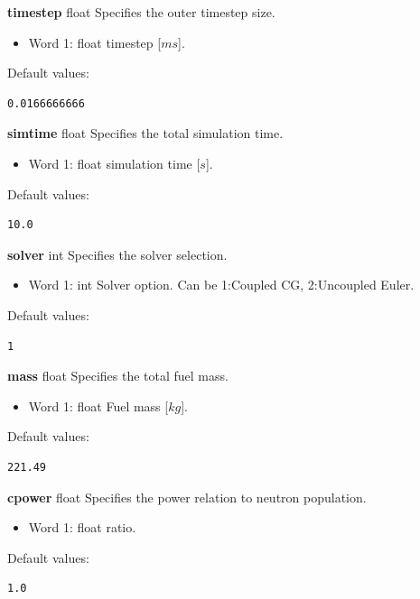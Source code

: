 \documentclass[11pt,letterpaper,titlepage]{article}
\begin{document}
\noindent
\textbf{timestep} {\color{blue} float} \newline
Specifies the outer timestep size.
\begin{itemize}
	\item Word 1: {\color{blue} float} timestep [$ms$].
\end{itemize}
Default values:
\begin{verbatim}
0.0166666666
\end{verbatim}
\vspace {0.5 cm}

\noindent
\textbf{simtime} {\color{blue} float} \newline
Specifies the total simulation time.
\begin{itemize}
	\item Word 1: {\color{blue} float} simulation time [$s$].
\end{itemize}
Default values:
\begin{verbatim}
10.0
\end{verbatim}
\vspace {0.5 cm}


\noindent
\textbf{solver} {\color{blue} int} \newline
Specifies the solver selection.
\begin{itemize}
	\item Word 1: {\color{blue} int} Solver option. Can be  {\color{blue}1}:Coupled CG, {\color{blue}2}:Uncoupled Euler.
\end{itemize}
Default values:
\begin{verbatim}
1
\end{verbatim}
\vspace {0.5 cm}

\newpage
\noindent
\textbf{mass} {\color{blue} float} \newline
Specifies the total fuel mass.
\begin{itemize}
	\item Word 1: {\color{blue} float} Fuel mass [$kg$].
\end{itemize}
Default values:
\begin{verbatim}
221.49
\end{verbatim}
\vspace {0.5 cm}


\noindent
\textbf{cpower} {\color{blue} float} \newline
Specifies the power relation to neutron population.
\begin{itemize}
	\item Word 1: {\color{blue} float} ratio.
\end{itemize}
Default values:
\begin{verbatim}
1.0
\end{verbatim}
\vspace {0.5 cm}
\end{document}
